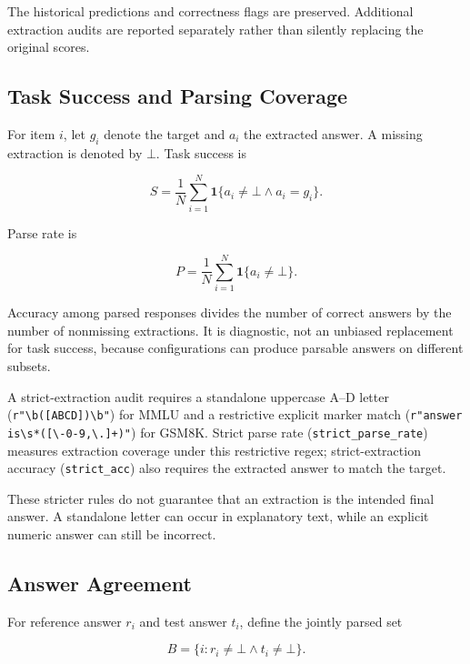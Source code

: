 \documentclass[conference]{IEEEtran}
\newcommand{\missing}{\bot}
\begin{document}
The historical predictions and correctness flags are
preserved. Additional extraction audits are reported
separately rather than silently replacing the original
scores.


\subsection{Task Success and Parsing Coverage}

For item $i$, let $g_i$ denote the target and $a_i$
the extracted answer. A missing extraction is denoted by
$\missing$. Task success is

\begin{equation}
S =
\frac{1}{N}
\sum_{i=1}^{N}
\mathbf{1}\{a_i\neq\missing \land a_i=g_i\}.
\label{eq:success}
\end{equation}

Parse rate is

\begin{equation}
P =
\frac{1}{N}
\sum_{i=1}^{N}
\mathbf{1}\{a_i\neq\missing\}.
\label{eq:parse}
\end{equation}

Accuracy among parsed responses divides the number of
correct answers by the number of nonmissing extractions.
It is diagnostic, not an unbiased replacement for task
success, because configurations can produce parsable
answers on different subsets.

A strict-extraction audit requires a standalone uppercase
A--D letter (\texttt{r"\textbackslash b([ABCD])\textbackslash b"})
for MMLU and a restrictive explicit marker match
(\texttt{r"answer is\textbackslash s*([\textbackslash -0-9,\textbackslash .]+)"})
for GSM8K. Strict parse rate (\texttt{strict\_parse\_rate})
measures extraction coverage under this restrictive regex;
strict-extraction accuracy (\texttt{strict\_acc}) also
requires the extracted answer to match the target.

These stricter rules do not guarantee that an extraction
is the intended final answer. A standalone letter can occur
in explanatory text, while an explicit numeric answer can
still be incorrect.


\subsection{Answer Agreement}

For reference answer $r_i$ and test answer $t_i$,
define the jointly parsed set

\begin{equation}
B = \{i:r_i\neq\missing \land t_i\neq\missing\}.
\label{eq:both}
\end{equation}
\end{document}
